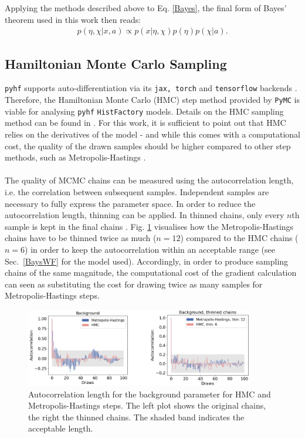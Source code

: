 \noindent Applying the methods described above to Eq. \eqref{Bayes}, the final form of Bayes' theorem used in this work then reads:
    \begin{align} \label{BayesConj_final}
        p(\eta, \chi \vert x, a) \propto p(x\vert \eta, \chi) p(\eta) p(\chi | a).
    \end{align}


\subsection{Hamiltonian Monte Carlo Sampling}
\texttt{pyhf} supports auto-differentiation via its \texttt{jax, torch} and \texttt{tensorflow} backends \cite{pyhf, pyhf_joss, jax2018github, tensorflow2015-whitepaper, paszke2017automatic}. Therefore, the Hamiltonian Monte Carlo (HMC) step method provided by \texttt{PyMC} is viable for analysing \texttt{pyhf} \texttt{HistFactory} models. Details on the HMC sampling method can be found in \cite{vishnoi2021introduction}. For this work, it is sufficient to point out that HMC relies on the derivatives of the model - and while this comes with a computational cost, the quality of the drawn samples should be higher compared to other step methods, such as Metropolis-Hastings \cite{Metropolis1953}. \\ \\
\noindent The quality of MCMC chains can be measured using the autocorrelation length, i.e. the correlation between subsequent samples. Independent samples are necessary to fully express the parameter space. In order to reduce the autocorrelation length, thinning can be applied. In thinned chains, only every $n$th sample is kept in the final chains \cite{hoyer2017xarray}. Fig. \ref{autocorr} visualises how the Metropolis-Hastings chains have to be thinned twice as much ($n=12$) compared to the HMC chains ($n=6$) in order to keep the autocorrelation within an acceptable range (see Sec.~\ref{BaysWF} for the model used). Accordingly, in order to produce sampling chains of the same magnitude, the computational cost of the gradient calculation can seen as substituting the cost for drawing twice as many samples for Metropolis-Hastings steps.
    \begin{figure}%
        \centering
        \includegraphics[width=10cm]{figures/autocorr.png}
        \centering
        \caption{Autocorrelation length for the background parameter for HMC and Metropolis-Hastings steps. The left plot shows the original chains, the right the thinned chains. The shaded band indicates the acceptable length.}
        \label{autocorr}
    \end{figure}
